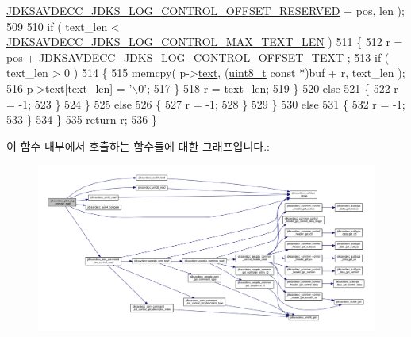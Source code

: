 \begin{DoxyCode}
      \hyperlink{group__jdks__log_gad860e4d61ae3f91cd3f9799e6b1dd3c5}{JDKSAVDECC\_JDKS\_LOG\_CONTROL\_OFFSET\_RESERVED} + pos, len );
509 
510                 \textcolor{keywordflow}{if} ( text\_len < \hyperlink{group__jdks__log_gaaa43d62d581d06b4c563a3ac9f689730}{JDKSAVDECC\_JDKS\_LOG\_CONTROL\_MAX\_TEXT\_LEN}
       )
511                 \{
512                     r = pos + \hyperlink{group__jdks__log_gaa3f2c42190fdfb5a9f8927254dcc38f0}{JDKSAVDECC\_JDKS\_LOG\_CONTROL\_OFFSET\_TEXT}
      ;
513                     \textcolor{keywordflow}{if} ( text\_len > 0 )
514                     \{
515                         memcpy( p->\hyperlink{group__jdks_ga77513c59b654d8ce1e07a7f3bcdf70db}{text}, (\hyperlink{stdint_8h_aba7bc1797add20fe3efdf37ced1182c5}{uint8\_t} \textcolor{keyword}{const} *)buf + r, text\_len );
516                         p->\hyperlink{group__jdks_ga77513c59b654d8ce1e07a7f3bcdf70db}{text}[text\_len] = \textcolor{charliteral}{'\(\backslash\)0'};
517                     \}
518                     r = text\_len;
519                 \}
520                 \textcolor{keywordflow}{else}
521                 \{
522                     r = -1;
523                 \}
524             \}
525             \textcolor{keywordflow}{else}
526             \{
527                 r = -1;
528             \}
529         \}
530         \textcolor{keywordflow}{else}
531         \{
532             r = -1;
533         \}
534     \}
535     \textcolor{keywordflow}{return} r;
536 \}
\end{DoxyCode}


이 함수 내부에서 호출하는 함수들에 대한 그래프입니다.\+:
\nopagebreak
\begin{figure}[H]
\begin{center}
\leavevmode
\includegraphics[width=350pt]{group__jdks__log_gae585c2248e5de55f0cc52a0241a8cd21_cgraph}
\end{center}
\end{figure}


